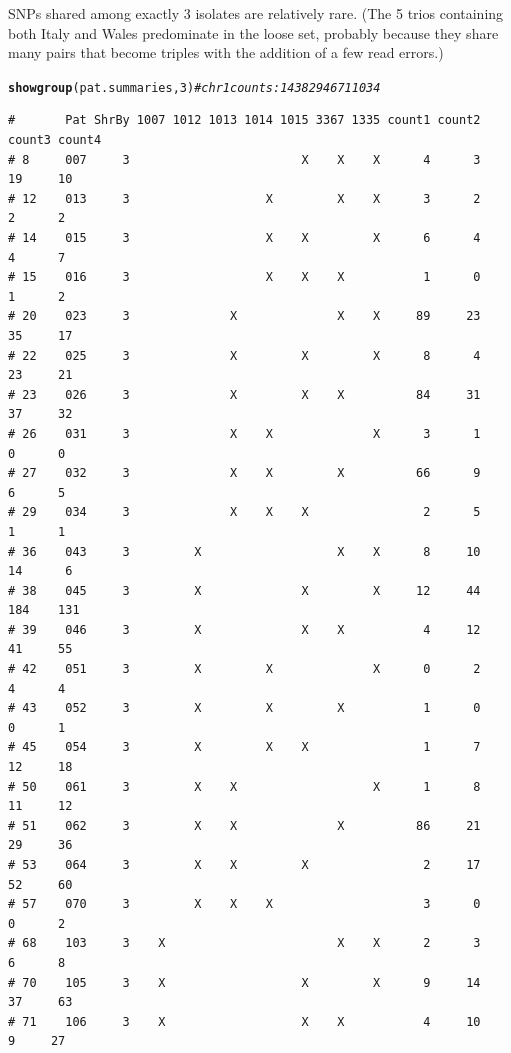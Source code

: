 \documentclass{article}\usepackage[]{graphicx}\usepackage[]{color}
\makeatletter
\newcommand{\hlnum}[1]{\textcolor[rgb]{0.686,0.059,0.569}{#1}}%
\newcommand{\hlcom}[1]{\textcolor[rgb]{0.678,0.584,0.686}{\textit{#1}}}%
\newcommand{\hlstd}[1]{\textcolor[rgb]{0.345,0.345,0.345}{#1}}%
\newcommand{\hlkwd}[1]{\textcolor[rgb]{0.737,0.353,0.396}{\textbf{#1}}}%
\newenvironment{kframe}{%
 \def\at@end@of@kframe{}%
 \ifinner\ifhmode%
  \def\at@end@of@kframe{\end{minipage}}%
  \begin{minipage}{\columnwidth}%
 \fi\fi%
 \def\FrameCommand##1{\hskip\@totalleftmargin \hskip-\fboxsep
 \colorbox{shadecolor}{##1}\hskip-\fboxsep
     \hskip-\linewidth \hskip-\@totalleftmargin \hskip\columnwidth}%
 \MakeFramed {\advance\hsize-\width
   \@totalleftmargin\z@ \linewidth\hsize
   \@setminipage}}%
 {\par\unskip\endMakeFramed%
 \at@end@of@kframe}
\newenvironment{knitrout}{}{} %
\makeatother
\begin{document}
SNPs shared among exactly 3 isolates are relatively rare.  (The 5 trios containing both Italy and Wales predominate in
the loose set, probably because they share many pairs that become triples with the addition of a few read errors.)

\begin{knitrout}\footnotesize
{}\color{fgcolor}\begin{kframe}
\begin{alltt}
\hlkwd{showgroup}\hlstd{(pat.summaries,}\hlnum{3}\hlstd{)} \hlcom{# chr 1 counts: 1438    294    671  1034}
\end{alltt}
\begin{verbatim}
#       Pat ShrBy 1007 1012 1013 1014 1015 3367 1335 count1 count2 count3 count4
# 8     007     3                        X    X    X      4      3     19     10
# 12    013     3                   X         X    X      3      2      2      2
# 14    015     3                   X    X         X      6      4      4      7
# 15    016     3                   X    X    X           1      0      1      2
# 20    023     3              X              X    X     89     23     35     17
# 22    025     3              X         X         X      8      4     23     21
# 23    026     3              X         X    X          84     31     37     32
# 26    031     3              X    X              X      3      1      0      0
# 27    032     3              X    X         X          66      9      6      5
# 29    034     3              X    X    X                2      5      1      1
# 36    043     3         X                   X    X      8     10     14      6
# 38    045     3         X              X         X     12     44    184    131
# 39    046     3         X              X    X           4     12     41     55
# 42    051     3         X         X              X      0      2      4      4
# 43    052     3         X         X         X           1      0      0      1
# 45    054     3         X         X    X                1      7     12     18
# 50    061     3         X    X                   X      1      8     11     12
# 51    062     3         X    X              X          86     21     29     36
# 53    064     3         X    X         X                2     17     52     60
# 57    070     3         X    X    X                     3      0      0      2
# 68    103     3    X                        X    X      2      3      6      8
# 70    105     3    X                   X         X      9     14     37     63
# 71    106     3    X                   X    X           4     10      9     27

\end{verbatim}
\end{kframe}
\end{knitrout}
\end{document}
